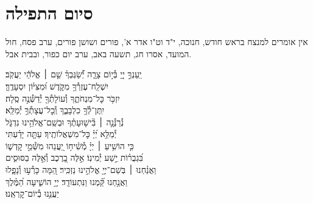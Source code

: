 \documentclass[twoside, openany, parskip=half, 11pt]{book}
\begin{document}
\hagbaha

\nextpage

\galila

\yehalelu

\negline
\kafdalet


\etzchaim






\section[סיום התפילה]{ סיום התפילה }
\label{ashrei}
\ashrei

\begin{scriptsize} %
\textsf{
אין אומרים למנצח בראש חודש, חנוכה, י"ד וט"ו אדר א', פורים ושושן פורים,
ערב פסח, חול המועד, אסרו חג, תשעה באב, ערב יום כפור, ובבית אבל.}

\end{scriptsize}

\begin{narrow}
\hfill \break
יַֽעַנְךָ֣ יְיָ֭ בְּ֯י֣וֹם צָרָ֑ה \hfill יְ֯֝שַׂגֶּבְךָ֗ שֵׁ֤ם ׀ אֱלֹהֵ֬י יַעֲקֹֽב׃ \\
יִשְׁלַֽח־עֶזְרְ֯ךָ֥ מִקֹּ֑דֶשׁ \hfill וּ֝מִצִּיּ֗וֹן יִסְעָדֶֽךָּ׃ \\
יִזְכֹּ֥ר כׇּל־מִנְחֹתֶ֑ךָ \hfill וְ֯עוֹלָתְ֯ךָ֖ יְ֯דַשְּׁ֯נֶ֣ה סֶֽלָה׃ \\
יִֽתֶּן־לְ֯ךָ֥ כִלְבָבֶ֑ךָ \hfill וְֽ֯כׇל־עֲצָתְ֯ךָ֥ יְ֯מַלֵּֽא׃ \\
נְ֯רַנְּ֯נָ֤ה ׀ בִּ֘ישׁ֤וּעָתֶ֗ךָ \hfill וּבְשֵֽׁם־אֱלֹהֵ֥ינוּ נִדְגֹּ֑ל \\ יְ֯מַלֵּ֥א יְ֝יָ֗ כׇּל־מִשְׁאֲלוֹתֶֽיךָ׃ \hfill
עַתָּ֤ה יָדַ֗עְתִּי\\ כִּ֤י הוֹשִׁ֥יעַ ׀ יְיָ֗ מְ֯שִׁ֫יח֥וֹ \hfill יַ֭עֲנֵהוּ מִשְּׁ֯מֵ֣י קׇדְשׁ֑וֹ\\ בִּ֝גְבֻר֗וֹת יֵ֣שַׁע יְ֯מִינֽוֹ׃ \hfill
אֵ֣לֶּה בָ֭רֶכֶב וְ֯אֵ֣לֶּה בַסּוּסִ֑ים\\ וַאֲנַ֓חְנוּ ׀ בְּשֵׁם־יְיָ֖ אֱלֹהֵ֣ינוּ נַזְכִּֽיר׃ \hfill
הֵ֭מָּה כָּרְ֯ע֣וּ וְ֯נָפָ֑לוּ \\ וַאֲנַ֥חְנוּ קַּ֝֗מְנוּ וַנִּתְעוֹדָֽד׃ \hfill
יְיָ֥ הוֹשִׁ֑יעָה הַ֝מֶּ֗לֶךְ\\ יַעֲנֵ֥נוּ בְ֯יוֹם־קׇרְאֵֽנוּ׃ \hfill \break

\end{narrow}
\end{document}
